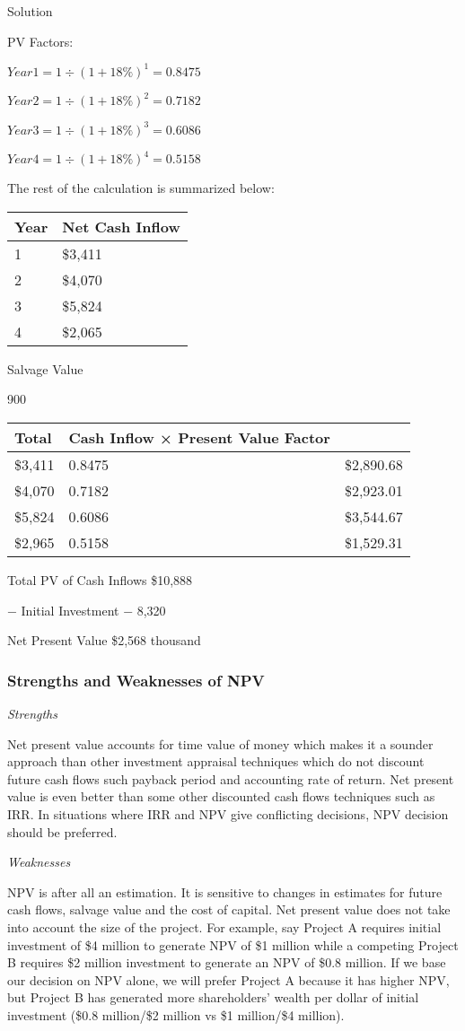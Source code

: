 \documentclass[]{book}
\theoremstyle{definition}
\theoremstyle{definition}
\theoremstyle{definition}
\theoremstyle{remark}
\begin{document}
Solution

PV Factors:

\(Year 1 = 1 ÷ (1 + 18 \%)^1 = 0.8475\)

\(Year 2 = 1 ÷ (1 + 18 \%)^2 = 0.7182\)

\(Year 3 = 1 ÷ (1 + 18 \%)^3 = 0.6086\)

\(Year 4 = 1 ÷ (1 + 18 \%)^4 = 0.5158\)

The rest of the calculation is summarized below:

\begin{longtable}[]{@{}ll@{}}
\toprule
Year & Net Cash Inflow\tabularnewline
\midrule
\endhead
1 & \$3,411\tabularnewline
2 & \$4,070\tabularnewline
3 & \$5,824\tabularnewline
4 & \$2,065\tabularnewline
\bottomrule
\end{longtable}

Salvage Value

900

\begin{longtable}[]{@{}lll@{}}
\toprule
Total & Cash Inflow × Present Value Factor &\tabularnewline
\midrule
\endhead
\$3,411 & 0.8475 & \$2,890.68\tabularnewline
\$4,070 & 0.7182 & \$2,923.01\tabularnewline
\$5,824 & 0.6086 & \$3,544.67\tabularnewline
\$2,965 & 0.5158 & \$1,529.31\tabularnewline
\bottomrule
\end{longtable}

Total PV of Cash Inflows \$10,888

− Initial Investment − 8,320

Net Present Value \$2,568 thousand

\subsubsection{Strengths and Weaknesses of
NPV}\label{strengths-and-weaknesses-of-npv}

\emph{Strengths}

Net present value accounts for time value of money which makes it a
sounder approach than other investment appraisal techniques which do not
discount future cash flows such payback period and accounting rate of
return. Net present value is even better than some other discounted cash
flows techniques such as IRR. In situations where IRR and NPV give
conflicting decisions, NPV decision should be preferred.

\emph{Weaknesses}

NPV is after all an estimation. It is sensitive to changes in estimates
for future cash flows, salvage value and the cost of capital. Net
present value does not take into account the size of the project. For
example, say Project A requires initial investment of \$4 million to
generate NPV of \$1 million while a competing Project B requires \$2
million investment to generate an NPV of \$0.8 million. If we base our
decision on NPV alone, we will prefer Project A because it has higher
NPV, but Project B has generated more shareholders' wealth per dollar of
initial investment (\$0.8 million/\$2 million vs \$1 million/\$4
million).
\end{document}
